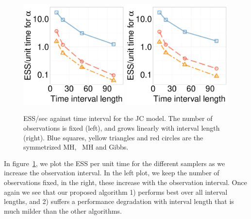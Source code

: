   \begin{figure}%
  \centering
  \begin{minipage}[!hp]{0.58\linewidth}
  \centering
    \includegraphics [width=0.49\textwidth, angle=0]{figs/new_experiment_figs/ESS_vs_t_alpha_JC.pdf}
    \includegraphics [width=0.49\textwidth, angle=0]{figs/new_experiment_figs/ESS_vs_t_alpha_fixobservation_JC.pdf}
  \end{minipage}
  \begin{minipage}[!hp]{0.01\linewidth}
  \end{minipage}
  \begin{minipage}[!hp]{0.4\linewidth}
    \caption{ESS/sec against time interval for the JC model. The number of observations is fixed (left), and grows linearly with interval length (right). {Blue squares, yellow triangles and red circles} are the symmetrized MH, \naive\ MH and Gibbs. }
	\label{fig:jc_model_vs_t}
  \end{minipage}
  \end{figure}


In figure~\ref{fig:jc_model_vs_t}, we plot the ESS per unit time for the
different samplers as we increase the observation interval. In the left plot,
we keep the number of observations fixed, in the right, these increase with
the observation interval. Once again we see that our proposed algorithm
1) performs best over all interval lengths, and 2) suffers a performance
degradation with interval length that is much milder than the other algorithms.

